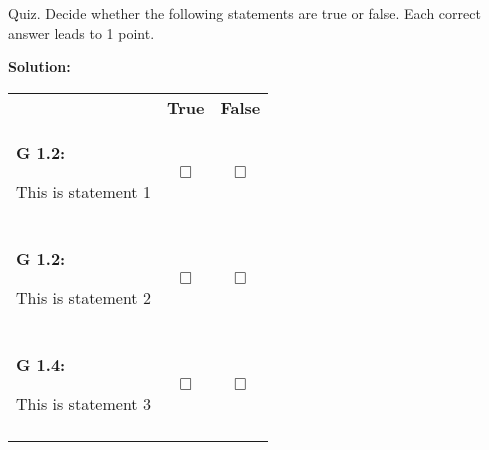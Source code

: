 \newpage
\begin{question}{10}
	\vspace{0.2cm}

	 Quiz. Decide whether the following statements are true or false. Each correct answer leads to 1 point. \\
	\begin{solution}
		\textbf{Solution:}
	\end{solution}

	 \begin{tabular}{p{30em} c c} 
  
		& \textbf{True} & \textbf{False} \\ 
                        
		\begin{learningGoal}\textbf{G 1.2:}\end{learningGoal}
		This is statement 1  & 
		 \begin{solution}\rlap{\xmark}\end{solution}$\Box$    &$\Box$    \\                                                                                                               
		& & \\

		\begin{learningGoal}\textbf{G 1.2:}\end{learningGoal}
		This is statement 2 & 
		$\Box$    & \begin{solution}\rlap{\xmark}\end{solution}$\Box$    \\                                                                                                               
		& & \\

		\begin{learningGoal}\textbf{G 1.4:}\end{learningGoal}
		This is statement 3  & 
		\begin{solution}\rlap{\xmark}\end{solution}$\Box$    &$\Box$    \\                                                                                                               
		& & \\
                    
	\end{tabular}
\end{question}




